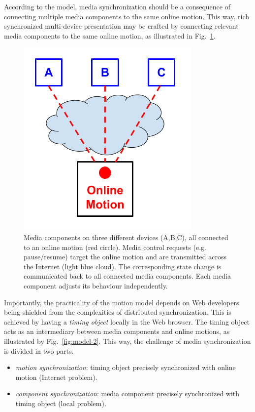 \documentclass[graybox]{svmult}
\begin{document}
According to the model, media synchronization should be a consequence of
connecting multiple media components to the same online motion. This way, rich
synchronized multi-device presentation may be crafted by connecting relevant
media components to the same online motion, as illustrated in Fig.~\ref{fig:model}.

\begin{figure}[h]
\centering
\includegraphics[scale=.4]{fig/motion-model.png}
\caption{Media components on three different devices (A,B,C), all connected to an online motion
(red circle). Media control requests (e.g. pause/resume) target the online motion and are transmitted across the Internet (light blue cloud). The corresponding state change is
communicated back to all connected media components. Each media component
adjusts its behaviour independently.}
\label{fig:model}
\end{figure}

Importantly, the practicality of the motion model depends on Web developers
being shielded from the complexities of distributed synchronization. This is
achieved by having a \emph{timing object} locally in the Web browser. The
timing object acts as an intermediary between media components and online
motions, as illustrated by Fig.~\ref{fig:model-2}. This way, the challenge of
media synchronization is divided in two parts.

\begin{itemize}
\item{\emph{motion synchronization}: timing object precisely synchronized with online motion (Internet problem).}
\item{\emph{component synchronization}: media component precisely synchronized with timing object (local problem).} 
\end{itemize}
\end{document}
